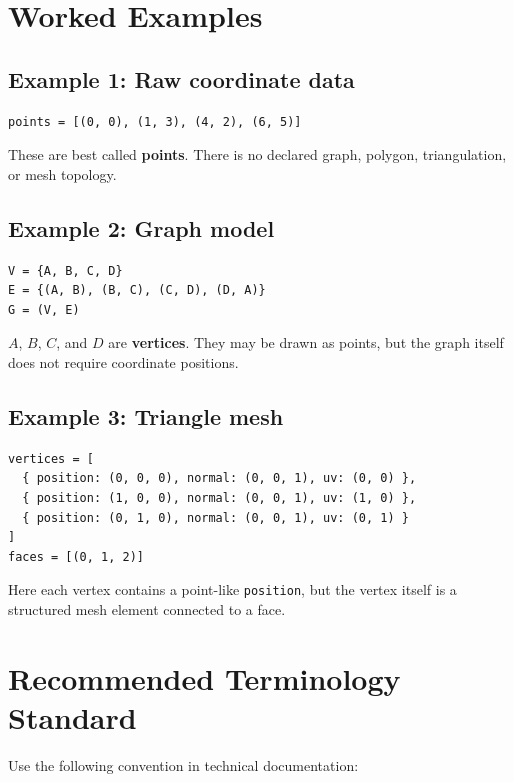 \documentclass[11pt]{article}
\begin{document}
\section{Worked Examples}

\subsection*{Example 1: Raw coordinate data}

\begin{verbatim}
points = [(0, 0), (1, 3), (4, 2), (6, 5)]
\end{verbatim}

These are best called \textbf{points}. There is no declared graph, polygon, triangulation, or mesh topology.

\subsection*{Example 2: Graph model}

\begin{verbatim}
V = {A, B, C, D}
E = {(A, B), (B, C), (C, D), (D, A)}
G = (V, E)
\end{verbatim}

\(A\), \(B\), \(C\), and \(D\) are \textbf{vertices}. They may be drawn as points, but the graph itself does not require coordinate positions.

\subsection*{Example 3: Triangle mesh}

\begin{verbatim}
vertices = [
  { position: (0, 0, 0), normal: (0, 0, 1), uv: (0, 0) },
  { position: (1, 0, 0), normal: (0, 0, 1), uv: (1, 0) },
  { position: (0, 1, 0), normal: (0, 0, 1), uv: (0, 1) }
]
faces = [(0, 1, 2)]
\end{verbatim}

Here each vertex contains a point-like \texttt{position}, but the vertex itself is a structured mesh element connected to a face.

\section{Recommended Terminology Standard}

Use the following convention in technical documentation:
\end{document}

